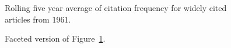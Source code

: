 \documentclass[
  10pt,
  letterpaper,
  DIV=11,
  numbers=noendperiod,
  twoside]{scrartcl}
\begin{document}
\begin{figure}


\caption{\label{fig-citation-spaghetti-1961}Rolling five year average of
citation frequency for widely cited articles from 1961.}

\end{figure}%

\begin{figure}


\caption{\label{fig-citation-facet-1961}Faceted version of
Figure~\ref{fig-citation-spaghetti-1961}.}

\end{figure}%
\end{document}
